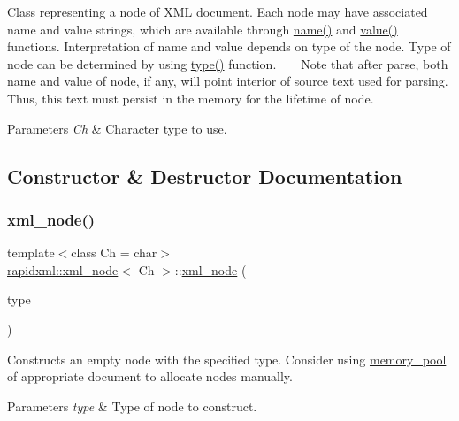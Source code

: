 Class representing a node of X\+ML document. Each node may have associated name and value strings, which are available through \mbox{\hyperlink{classrapidxml_1_1xml__base_aef8ae147fbee59209f714274afc80dc4}{name()}} and \mbox{\hyperlink{classrapidxml_1_1xml__base_a6af65de5e59ac497cd69838f8a89d602}{value()}} functions. Interpretation of name and value depends on type of the node. Type of node can be determined by using \mbox{\hyperlink{classrapidxml_1_1xml__node_a5f91729128856b0aaab598d4364ace60}{type()}} function. ~\newline
~\newline
 Note that after parse, both name and value of node, if any, will point interior of source text used for parsing. Thus, this text must persist in the memory for the lifetime of node.
\begin{DoxyParams}{Parameters}
{\em Ch} & Character type to use. \\
\hline
\end{DoxyParams}


\subsection{Constructor \& Destructor Documentation}
\mbox{\label{classrapidxml_1_1xml__node_a8bd9019960b90605a45998b661fb1b0e}} 
\subsubsection{\texorpdfstring{xml\_node()}{xml\_node()}\hspace{0.1cm}{\footnotesize\ttfamily [1/2]}}
{\footnotesize\ttfamily template$<$class Ch = char$>$ \\
\mbox{\hyperlink{classrapidxml_1_1xml__node}{rapidxml\+::xml\+\_\+node}}$<$ Ch $>$\+::\mbox{\hyperlink{classrapidxml_1_1xml__node}{xml\+\_\+node}} (\begin{DoxyParamCaption}\item[{\mbox{\hyperlink{namespacerapidxml_abb456db38f7efb746c4330eed6072a7c}{node\+\_\+type}}}]{type }\end{DoxyParamCaption})\hspace{0.3cm}{\ttfamily [inline]}}

Constructs an empty node with the specified type. Consider using \mbox{\hyperlink{classrapidxml_1_1memory__pool}{memory\+\_\+pool}} of appropriate document to allocate nodes manually.
\begin{DoxyParams}{Parameters}
{\em type} & Type of node to construct. \\
\hline
\end{DoxyParams}
\mbox{\label{classrapidxml_1_1xml__node_af5f365f98059708e7180c0fbcf1412c5}} 
